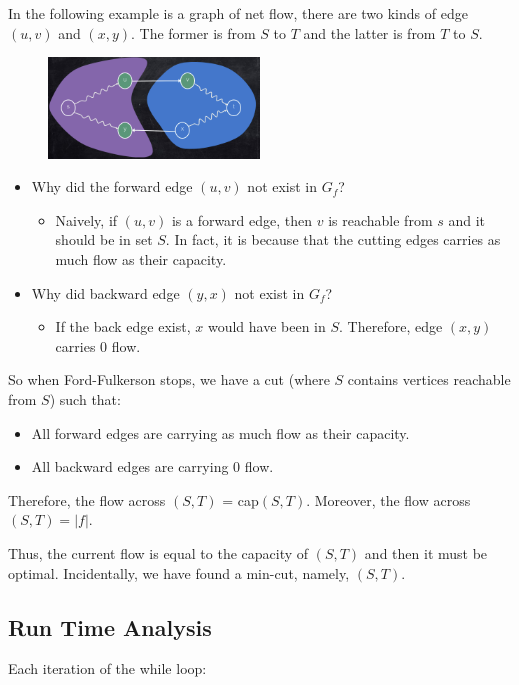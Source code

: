 In the following example is a graph of net flow, there are two kinds of edge $(u,v)$ and $(x,y)$. The former is from $S$ to $T$ and the latter is from $T$ to $S$.
\begin{figure}[H]
	\centering
	\includegraphics[width=0.5\textwidth]{fig/cut-2.png}
\end{figure}
\begin{itemize}
	\item Why did the forward edge $(u,v)$ not exist in $G_f$?
	\begin{itemize}
		\item Naively, if $(u, v)$ is a forward edge, then $v$ is reachable from $s$ and it should be in set $S$. In fact, it is because that the cutting edges carries as much flow as their capacity.
	\end{itemize}
	\item Why did backward edge $(y, x)$ not exist in $G_f$?
	\begin{itemize}
		\item If the back edge exist, $x$ would have been in $S$. Therefore, edge $(x, y)$ carries $0$ flow.
	\end{itemize}
\end{itemize}

So when Ford-Fulkerson stops, we have a cut (where $S$ contains vertices reachable from $S$) such that:
\begin{itemize}
	\item All forward edges are carrying as much flow as their capacity.
	\item All backward edges are carrying 0 flow.
\end{itemize}
Therefore, the flow across $(S, T)$ = cap$(S, T)$. Moreover, the flow across $(S, T) = |f|$.

Thus, the current flow is equal to the capacity of $(S, T)$ and then it must be optimal. Incidentally, we have found a min-cut, namely, $(S, T)$.

\subsection{Run Time Analysis}
Each iteration of the while loop:

